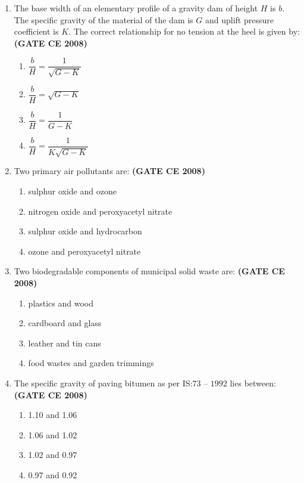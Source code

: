 \documentclass[journal]{IEEEtran}
\begin{document}
\begin{enumerate}
\item The base width of an elementary profile of a gravity dam of height $H$ is $b$. The specific gravity of the material of the dam is $G$ and uplift pressure coefficient is $K$. The correct relationship for no tension at the heel is given by: \textbf{(GATE CE 2008)}
\begin{multicols}{2}
\begin{enumerate}
\item $\dfrac{b}{H} = \dfrac{1}{\sqrt{G - K}}$ 
\item $\dfrac{b}{H} = \sqrt{G - K}$
\item $\dfrac{b}{H} = \dfrac{1}{G - K}$
\item $\dfrac{b}{H} = \dfrac{1}{K \sqrt{G - K}}$
\end{enumerate}
\end{multicols}

\item Two primary air pollutants are: \textbf{(GATE CE 2008)}
\begin{multicols}{2}
\begin{enumerate}
\item sulphur oxide and ozone  
\item nitrogen oxide and peroxyacetyl nitrate  
\item sulphur oxide and hydrocarbon  
\item ozone and peroxyacetyl nitrate
\end{enumerate}
\end{multicols}

\item Two biodegradable components of municipal solid waste are: \textbf{(GATE CE 2008)}
\begin{multicols}{2}
\begin{enumerate}
\item plastics and wood
\item cardboard and glass
\item leather and tin cans 
\item food wastes and garden trimmings
\end{enumerate}
\end{multicols}

\item The specific gravity of paving bitumen as per IS:$73$ -- $1992$ lies between: \textbf{(GATE CE 2008)}
\begin{multicols}{2}
\begin{enumerate}
\item 1.10 and 1.06  
\item 1.06 and 1.02  
\item 1.02 and 0.97  
\item 0.97 and 0.92
\end{enumerate}
\end{multicols}


\end{enumerate}
\end{document}
